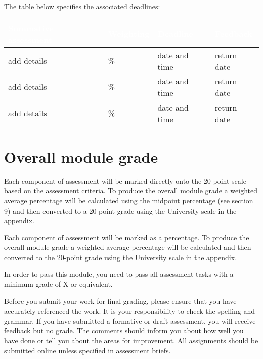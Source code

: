 \documentclass{MDXHandbook}
\begin{document}
The table below specifies the associated deadlines:

\begin{center}
	\begin{tabular}{|p{}|p{}|p{}|p{}|}
		\rowcolor{MDXCorporateRed}\hline
		\centering\textcolor{white}{Summative assessment} &
		\centering\textcolor{white}{Weighting} &
		\centering\textcolor{white}{Deadline} &
		\multicolumn{1}{|p{.25\textwidth}|}{\centering\textcolor{white}{Feedback}} \\
		\hline
		add details & \% & date and time & return date\\
		\hline
		add details & \% & date and time & return date\\
		\hline
		add details & \% & date and time & return date\\
		\hline
	\end{tabular}
\end{center}

\section*{Overall module grade}

Each component of assessment will be marked directly onto the 20-point scale based on the assessment criteria. To produce the overall module grade a weighted average percentage will be calculated using the midpoint percentage (see section 9) and then converted to a 20-point grade using the University scale in the appendix. 


Each component of assessment will be marked as a percentage. To produce the overall module grade a weighted average percentage will be calculated and then converted to the 20-point grade using the University scale in the appendix.  

In order to pass this module, you need to pass all assessment tasks with a minimum grade of X or equivalent.

Before you submit your work for final grading, please ensure that you have accurately referenced the work.  It is your responsibility to check the spelling and grammar.  If you have submitted a formative or draft assessment, you will receive feedback but no grade. The comments should inform you about how well you have done or tell you about the areas for improvement. All assignments should be submitted online unless specified in assessment briefs.
\end{document}
